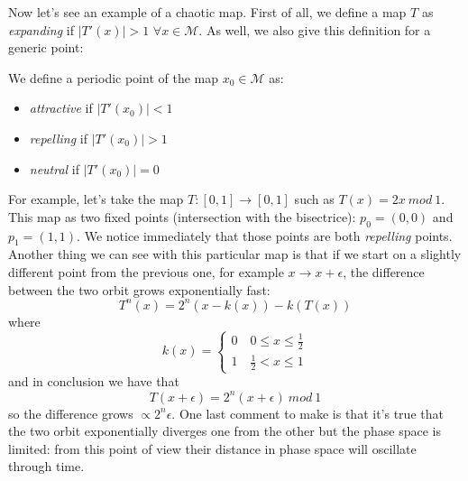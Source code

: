Now let's see an example of a chaotic map.
First of all, we define a map $T$ as \emph{expanding} if $\left\lvert T'\left(x\right)\right\rvert > 1$ $\forall x \in \mathcal{M}$.
As well, we also give this definition for a generic point:
\begin{definition}
    We define a periodic point of the map $x_0 \in \mathcal{M}$ as:
    \begin{itemize}
        \item \emph{attractive} if $\left\lvert T'\left(x_0\right)\right\rvert < 1$
        \item \emph{repelling} if $\left\lvert T'\left(x_0\right)\right\rvert > 1$
        \item \emph{neutral} if $\left\lvert T'\left(x_0\right)\right\rvert = 0$
    \end{itemize}
\end{definition}
For example, let's take the map $T : \left[0,1\right] \to \left[0,1\right]$ such as $T\left(x\right)=2x \ mod \ 1$.
This map as two fixed points (intersection with the bisectrice): $p_0 = \left(0,0\right)$ and $p_1 = \left(1,1\right)$.
We notice immediately that those points are both \emph{repelling} points.
Another thing we can see with this particular map is that if we start on a slightly different point from the previous one, for example $x \to x + \epsilon$, the difference between the two orbit grows exponentially fast:
$$
    T^n\left(x\right)=2^n\left(x-k\left(x\right)\right)-k\left(T\left(x\right)\right)
$$
where
$$
    k\left(x\right)=
    \begin{cases}
        0 \quad 0\leq x \leq \frac{1}{2} \\
        1 \quad \frac{1}{2} < x \leq 1
    \end{cases}
$$
and in conclusion we have that
$$
    T\left(x + \epsilon\right)=2^n\left(x + \epsilon\right) \ mod \ 1
$$
so the difference grows $\propto 2^n\epsilon$.
One last comment to make is that it's true that the two orbit exponentially diverges one from the other but the phase space is limited: from this point of view their distance in phase space will oscillate through time.


